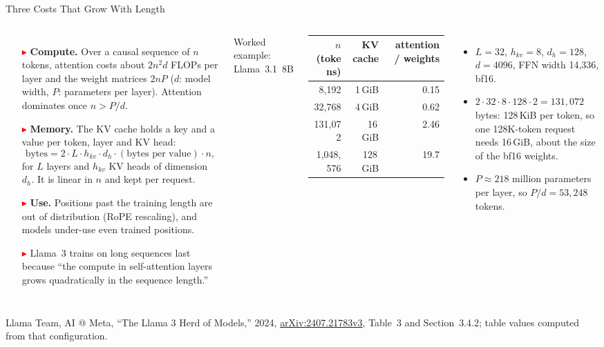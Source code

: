 \begin{frame}{Three Costs That Grow With Length}
  \begin{columns}[T,onlytextwidth]
      \begin{itemize}\footnotesize\itemsep0.35em
        \item[\textcolor{red}{$\blacktriangleright$}] \textbf{Compute.} Over a causal sequence of $n$ tokens, attention costs about $2n^2d$ FLOPs per layer and the weight matrices $2nP$ ($d$: model width, $P$: parameters per layer). Attention dominates once $n > P/d$.
        \item[\textcolor{red}{$\blacktriangleright$}] \textbf{Memory.} The KV cache holds a key and a value per token, layer and KV head:
          \[ \text{bytes} = 2 \cdot L \cdot h_{kv} \cdot d_h \cdot (\text{bytes per value}) \cdot n, \]
          for $L$ layers and $h_{kv}$ KV heads of dimension $d_h$. It is linear in $n$ and kept per request.
        \item[\textcolor{red}{$\blacktriangleright$}] \textbf{Use.} Positions past the training length are out of distribution (RoPE rescaling), and models under-use even trained positions.
        \item[\textcolor{red}{$\blacktriangleright$}] Llama~3 trains on long sequences last because ``the compute in self-attention layers grows quadratically in the sequence length.''
      \end{itemize}
      \centering
      {\footnotesize Worked example: Llama~3.1~8B}\\[0.3em]
      {\scriptsize
      \begin{tabular}{rrr}
        \toprule
        $n$ (tokens) & KV cache & attention / weights \\
        \midrule
        8,192 & 1\,GiB & 0.15 \\
        32,768 & 4\,GiB & 0.62 \\
        131,072 & 16\,GiB & 2.46 \\
        1,048,576 & 128\,GiB & 19.7 \\
        \bottomrule
      \end{tabular}\par}
      \vspace{0.4em}
      \begin{itemize}\scriptsize\itemsep0.15em
        \item $L = 32$, $h_{kv} = 8$, $d_h = 128$, $d = 4096$, FFN width 14,336, bf16.
        \item $2 \cdot 32 \cdot 8 \cdot 128 \cdot 2 = 131{,}072$ bytes: 128\,KiB per token, so one 128K-token request needs 16\,GiB, about the size of the bf16 weights.
        \item $P \approx 218$ million parameters per layer, so $P/d = 53{,}248$ tokens.
      \end{itemize}
  \end{columns}
  \vspace{0.1em}
  {\scriptsize Llama Team, AI @ Meta, ``The Llama 3 Herd of Models,'' 2024, \href{https://arxiv.org/abs/2407.21783v3}{arXiv:2407.21783v3}, Table~3 and Section~3.4.2; table values computed from that configuration.}
\end{frame}

